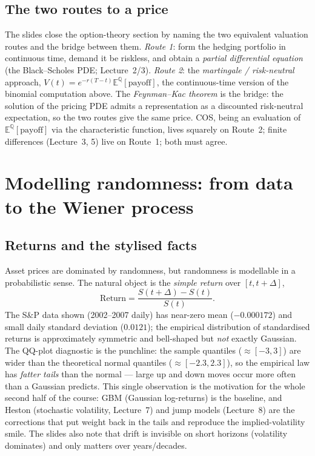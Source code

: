 \documentclass[11pt]{article}
\newcommand{\E}{\mathbb{E}}
\begin{document}
\subsection{The two routes to a price}

The slides close the option-theory section by naming the two equivalent valuation routes and the bridge between them. \emph{Route 1}: form the hedging portfolio in continuous time, demand it be riskless, and obtain a \emph{partial differential equation} (the Black--Scholes PDE; Lecture~2/3). \emph{Route 2}: the \emph{martingale / risk-neutral} approach, $V(t)=e^{-r(T-t)}\E^{\mathbb{Q}}[\text{payoff}]$, the continuous-time version of the binomial computation above. The \emph{Feynman--Kac theorem} is the bridge: the solution of the pricing PDE admits a representation as a discounted risk-neutral expectation, so the two routes give the same price. COS, being an evaluation of $\E^{\mathbb{Q}}[\text{payoff}]$ via the characteristic function, lives squarely on Route~2; finite differences (Lecture~3, 5) live on Route~1; both must agree.

\section{Modelling randomness: from data to the Wiener process}

\subsection{Returns and the stylised facts}

Asset prices are dominated by randomness, but randomness is modellable in a probabilistic sense. The natural object is the \emph{simple return} over $[t,t+\Delta]$,
\[
\text{Return}=\frac{S(t+\Delta)-S(t)}{S(t)}.
\]
The S\&P data shown (2002--2007 daily) has near-zero mean ($-0.000172$) and small daily standard deviation ($0.0121$); the empirical distribution of standardised returns is approximately symmetric and bell-shaped but \emph{not} exactly Gaussian. The QQ-plot diagnostic is the punchline: the sample quantiles ($\approx[-3,3]$) are wider than the theoretical normal quantiles ($\approx[-2.3,2.3]$), so the empirical law has \emph{fatter tails} than the normal --- large up and down moves occur more often than a Gaussian predicts. This single observation is the motivation for the whole second half of the course: GBM (Gaussian log-returns) is the baseline, and Heston (stochastic volatility, Lecture~7) and jump models (Lecture~8) are the corrections that put weight back in the tails and reproduce the implied-volatility smile. The slides also note that drift is invisible on short horizons (volatility dominates) and only matters over years/decades.
\end{document}
